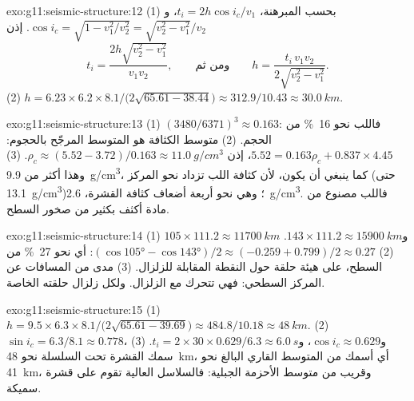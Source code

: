 \begin{solution}{exo:g11:seismic-structure:12}
(1) بحسب المبرهنة، $t_i = 2h\cos i_c/v_1$، و$\cos i_c = \sqrt{1 -
v_1^2/v_2^2} = \sqrt{v_2^2 - v_1^2}/v_2$. إذن
\[
  t_i = \frac{2h\sqrt{v_2^2 - v_1^2}}{v_1 v_2},
  \qquad\text{ومن ثم}\qquad
  h = \frac{t_i\,v_1 v_2}{2\sqrt{v_2^2 - v_1^2}}.
\]
(2) $h = 6.23 \times 6.2 \times 8.1/\bigl(2\sqrt{65.61 -
38.44}\bigr) \approx 312.9/10.43 \approx \qty{30.0}{km}$.
\end{solution}

\begin{solution}{exo:g11:seismic-structure:13}
(1) $(3480/6371)^3 \approx 0.163$: فاللب نحو \qty{16}{\percent} من
الحجم. (2) متوسط الكثافة هو المتوسط المرجّح بالحجوم: $5.52 = 0.163
\rho_c + 0.837 \times 4.45$، إذن $\rho_c \approx (5.52 - 3.72)/0.163 \approx
\qty{11.0}{g/cm^3}$. (3) وهذا أكثر من \qty{9.9}{g/cm^3}، كما ينبغي
أن يكون، لأن كثافة اللب تزداد نحو المركز (حتى
\qty{13.1}{g/cm^3})؛ وهي نحو أربعة أضعاف كثافة القشرة،
\qty{2.6}{g/cm^3}. فاللب مصنوع من مادة أكثف بكثير من صخور
السطح.
\end{solution}

\begin{solution}{exo:g11:seismic-structure:14}
(1) $105 \times 111.2 \approx \qty{11700}{km}$ و$143 \times 111.2 \approx
\qty{15900}{km}$. (2) $(\cos\ang{105} - \cos\ang{143})/2 \approx (-0.259 +
0.799)/2 \approx 0.27$: أي نحو \qty{27}{\percent} من السطح، على هيئة حلقة حول
النقطة المقابلة للزلزال. (3)  مدى من
المسافات عن المركز السطحي: فهي تتحرك مع الزلزال. ولكل زلزال
حلقته الخاصة.
\end{solution}

\begin{solution}{exo:g11:seismic-structure:15}
(1) $h = 9.5 \times 6.3 \times 8.1/\bigl(2\sqrt{65.61 - 39.69}\bigr) \approx
484.8/10.18 \approx \qty{48}{km}$. (2) $\sin i_c = 6.3/8.1 \approx 0.778$،
و$\cos i_c \approx 0.629$، و$t_i = 2 \times 30 \times 0.629/6.3 \approx
\qty{6.0}{s}$. (3) سمك القشرة تحت السلسلة نحو \qty{48}{km}،
أي أسمك من المتوسط القاري البالغ نحو \qty{41}{km}، وقريب من
متوسط الأحزمة الجبلية: فالسلاسل العالية تقوم على قشرة سميكة.
\end{solution}

